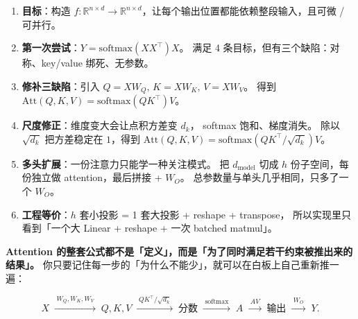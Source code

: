 \documentclass[11pt,a4paper]{ctexart}
\theoremstyle{definition}
\theoremstyle{remark}
\newcommand{\R}{\mathbb{R}}
\newcommand{\softmax}{\mathrm{softmax}}
\newcommand{\Att}{\mathrm{Att}}
\begin{document}
\begin{enumerate}
  \item \textbf{目标}：构造 $f: \R^{n \times d} \to \R^{n \times d}$，让每个输出位置都能依赖整段输入，且可微 / 可并行。
  \item \textbf{第一次尝试}：$Y = \softmax(XX^\top) X$。
        满足 4 条目标，但有三个缺陷：对称、key/value 绑死、无参数。
  \item \textbf{修补三缺陷}：引入 $Q = XW_Q,\, K = XW_K,\, V = XW_V$。
        得到 $\Att(Q,K,V) = \softmax(QK^\top) V$。
  \item \textbf{尺度修正}：维度变大会让点积方差变 $d_k$，
        softmax 饱和、梯度消失。
        除以 $\sqrt{d_k}$ 把方差稳定在 $1$，得到
        $\Att(Q,K,V) = \softmax(QK^\top/\sqrt{d_k}) V$。
  \item \textbf{多头扩展}：一份注意力只能学一种关注模式。
        把 $d_{\text{model}}$ 切成 $h$ 份子空间，每份独立做 attention，最后拼接 + $W_O$。
        总参数量与单头几乎相同，只多了一个 $W_O$。
  \item \textbf{工程等价}：$h$ 套小投影 = 1 套大投影 + reshape + transpose，
        所以实现里只看到「一个大 Linear + reshape + 一次 batched matmul」。
\end{enumerate}

\begin{keypoint}
\textbf{Attention 的整套公式都不是「定义」，而是「为了同时满足若干约束被推出来的结果」。}
你只要记住每一步的「为什么不能少」，就可以在白板上自己重新推一遍：

\[
  X \;\xrightarrow{\;W_Q, W_K, W_V\;} \; Q, K, V
  \;\xrightarrow{\;QK^\top/\sqrt{d_k}\;} \; \text{分数}
  \;\xrightarrow{\;\softmax\;} \; A
  \;\xrightarrow{\;A V\;} \; \text{输出}
  \;\xrightarrow{\;W_O\;} \; Y.
\]
\end{keypoint}
\end{document}
